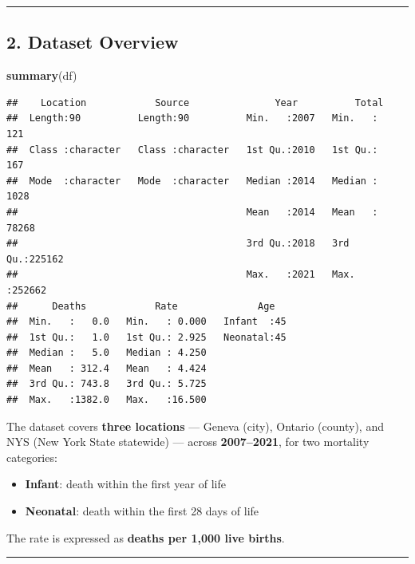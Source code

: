 \documentclass[
]{article}
\newenvironment{Shaded}{\begin{snugshade}}{\end{snugshade}}
\newcommand{\FunctionTok}[1]{\textcolor[rgb]{0.13,0.29,0.53}{\textbf{#1}}}
\newcommand{\NormalTok}[1]{#1}
\providecommand{\tightlist}{%
  \setlength{\itemsep}{0pt}\setlength{\parskip}{0pt}}
\begin{document}
\begin{center}\rule{0.5\linewidth}{0.5pt}\end{center}

\subsection{2. Dataset Overview}\label{dataset-overview}

\begin{Shaded}
\begin{Highlighting}[]
\FunctionTok{summary}\NormalTok{(df)}
\end{Highlighting}
\end{Shaded}

\begin{verbatim}
##    Location            Source               Year          Total       
##  Length:90          Length:90          Min.   :2007   Min.   :   121  
##  Class :character   Class :character   1st Qu.:2010   1st Qu.:   167  
##  Mode  :character   Mode  :character   Median :2014   Median :  1028  
##                                        Mean   :2014   Mean   : 78268  
##                                        3rd Qu.:2018   3rd Qu.:225162  
##                                        Max.   :2021   Max.   :252662  
##      Deaths            Rate              Age    
##  Min.   :   0.0   Min.   : 0.000   Infant  :45  
##  1st Qu.:   1.0   1st Qu.: 2.925   Neonatal:45  
##  Median :   5.0   Median : 4.250                
##  Mean   : 312.4   Mean   : 4.424                
##  3rd Qu.: 743.8   3rd Qu.: 5.725                
##  Max.   :1382.0   Max.   :16.500
\end{verbatim}

The dataset covers \textbf{three locations} --- Geneva (city), Ontario
(county), and NYS (New York State statewide) --- across
\textbf{2007--2021}, for two mortality categories:

\begin{itemize}
\tightlist
\item
  \textbf{Infant}: death within the first year of life
\item
  \textbf{Neonatal}: death within the first 28 days of life
\end{itemize}

The rate is expressed as \textbf{deaths per 1,000 live births}.

\begin{center}\rule{0.5\linewidth}{0.5pt}\end{center}
\end{document}
